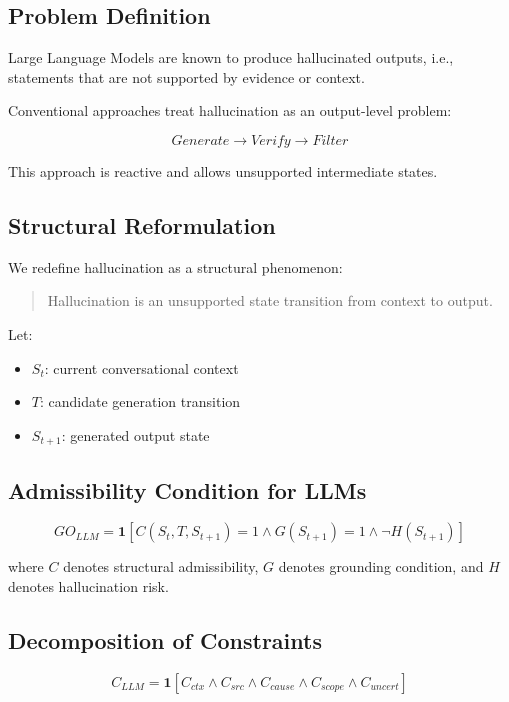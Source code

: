 \documentclass[11pt]{article}
\begin{document}
\subsection{Problem Definition}

Large Language Models are known to produce hallucinated outputs, i.e., statements that are not supported by evidence or context.

Conventional approaches treat hallucination as an output-level problem:

\[
Generate \rightarrow Verify \rightarrow Filter
\]

This approach is reactive and allows unsupported intermediate states.

\subsection{Structural Reformulation}

We redefine hallucination as a structural phenomenon:

\begin{quote}
Hallucination is an unsupported state transition from context to output.
\end{quote}

Let:

\begin{itemize}
\item $S_t$: current conversational context
\item $T$: candidate generation transition
\item $S_{t+1}$: generated output state
\end{itemize}

\subsection{Admissibility Condition for LLMs}

\[
GO_{LLM} =
\mathbf{1}
[
C(S_t,T,S_{t+1}) = 1
\land G(S_{t+1}) = 1
\land \neg H(S_{t+1})
]
\]

where $C$ denotes structural admissibility, $G$ denotes grounding condition, and $H$ denotes hallucination risk.

\subsection{Decomposition of Constraints}

\[
C_{LLM} =
\mathbf{1}
[
C_{ctx}
\land C_{src}
\land C_{cause}
\land C_{scope}
\land C_{uncert}
]
\]
\end{document}
